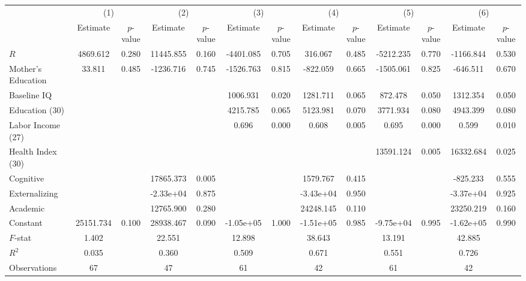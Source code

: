 
\begin{tabular}{lcccccccccccc} \toprule
 & \multicolumn{2}{c}{(1)}  &  \multicolumn{2}{c}{(2)}  &  \multicolumn{2}{c}{(3)}  &  \multicolumn{2}{c}{(4)}  & \multicolumn{2}{c}{(5)} & \multicolumn{2}{c}{(6)} \\  
 & Estimate & $p$-value & Estimate & $p$-value & Estimate & $p$-value & Estimate & $p$-value & Estimate & $p$-value & Estimate & $p$-value \\ \midrule
$R$ &  4869.612 &     0.280 & 11445.855 &     0.160 & -4401.085 &     0.705 &   316.067 &     0.485 & -5212.235 &     0.770 & -1166.844 &     0.530 \\  
Mother's Education &    33.811 &     0.485 & -1236.716 &     0.745 & -1526.763 &     0.815 &  -822.059 &     0.665 & -1505.061 &     0.825 &  -646.511 &     0.670 \\  
Baseline IQ &         &         &         &         &  1006.931 &     0.020 &  1281.711 &     0.065 &   872.478 &     0.050 &  1312.354 &     0.050 \\  
Education (30) &         &         &         &         &  4215.785 &     0.065 &  5123.981 &     0.070 &  3771.934 &     0.080 &  4943.399 &     0.080 \\  
Labor Income (27) &         &         &         &         &     0.696 &     0.000 &     0.608 &     0.005 &     0.695 &     0.000 &     0.599 &     0.010 \\  
Health Index (30) &         &         &         &         &         &         &         &         & 13591.124 &     0.005 & 16332.684 &     0.025 \\  
Cognitive &         &         & 17865.373 &     0.005 &         &         &  1579.767 &     0.415 &         &         &  -825.233 &     0.555 \\  
Externalizing &         &         & -2.33e+04 &     0.875 &         &         & -3.43e+04 &     0.950 &         &         & -3.37e+04 &     0.925 \\  
Academic &         &         & 12765.900 &     0.280 &         &         & 24248.145 &     0.110 &         &         & 23250.219 &     0.160 \\  
Constant & 25151.734 &     0.100 & 28938.467 &     0.090 & -1.05e+05 &     1.000 & -1.51e+05 &     0.985 & -9.75e+04 &     0.995 & -1.62e+05 &     0.990 \\  \midrule
$F$-stat &     1.402 &         &    22.551 &         &    12.898 &         &    38.643 &         &    13.191 &         &    42.885 &         \\  
$R^2$ &     0.035 &         &     0.360 &         &     0.509 &         &     0.671 &         &     0.551 &         &     0.726 &         \\  
Observations &    67 &         &    47 &         &    61 &         &    42 &         &    61 &         &    42 &         \\  
\bottomrule \end{tabular}

